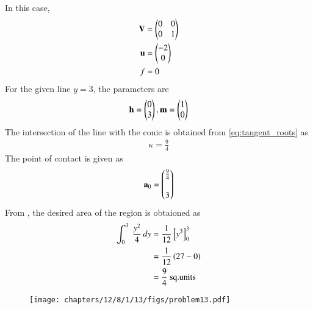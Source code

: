 In this case, 
\begin{align}
	\mathbf{V} &= \begin{pmatrix} 0 & 0 \\ 0 & 1\end{pmatrix} \\
	\mathbf{u} &= \begin{pmatrix}-2 \\ 0\end{pmatrix} \\
	f &= 0
\end{align}
For the given line $y=3$, the parameters are
\begin{align}
	\mathbf{h} = \begin{pmatrix}0 \\ 3\end{pmatrix} , \mathbf{m} = \begin{pmatrix}1 \\ 0 \end{pmatrix}
\end{align}
The intersection of 
the line with the conic is obtained from \eqref{eq:tangent_roots} 
as
\begin{align}
	\kappa  = \frac{9}{4} 
\end{align}
The point of contact is given as
\begin{align}
	\mathbf{a}_0 = \begin{pmatrix}\frac{9}{4}  \\[1pt] \\ 3\end{pmatrix}
\end{align}
From ,
the desired area of the region is obtaioned as
\begin{align}
	\int_{0}^{3} \ \frac{y^2}{4} \,dy &= \frac{1}{12}{}\left[y^3\right]_{0}^{3} \\
	&= \frac{1}{12}\left(27-0\right) \\
	&= \frac{9}{4} \text{ sq.units}
\end{align}
\begin{figure}[H]
	\begin{center}
		\texttt{[image: chapters/12/8/1/13/figs/problem13.pdf]}
	\end{center}
\caption{}
\label{fig:chapters/12/8/1/13/Fig1}
\end{figure}
